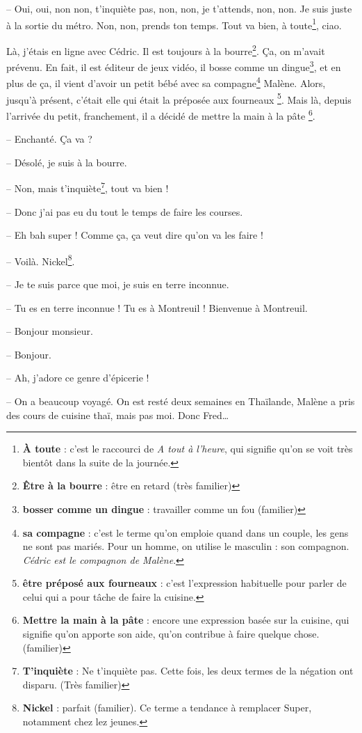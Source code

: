 \documentclass[11pt, french]{report}
\begin{document}
-- Oui, oui, non non, t’inquiète pas, non, non, je t’attends, non, non. Je suis
juste à la sortie du métro. Non, non, prends ton temps. Tout va bien,
à toute\footnote{\textbf{À toute} : c’est le raccourci de
  \textit{A tout à l’heure}, qui signifie qu’on se voit très bientôt dans la
  suite de la journée.}, ciao.

Là, j’étais en ligne avec Cédric. Il est toujours à la
bourre\footnote{\textbf{Être à la bourre} : être en retard (très familier)}.
Ça, on m’avait prévenu. En fait, il est éditeur de jeux vidéo, il bosse comme
un dingue\footnote{\textbf{bosser comme un dingue} : travailler comme un
  fou (familier)}, et en plus de ça, il vient d’avoir un petit bébé avec sa
compagne\footnote{\textbf{sa compagne} : c’est le terme qu’on emploie quand
  dans un couple, les gens ne sont pas mariés. Pour un homme, on utilise le
  masculin : son compagnon. \textit{Cédric est le compagnon de Malène}.} Malène.
Alors, jusqu’à présent, c’était elle qui était la préposée aux fourneaux
\footnote{\textbf{être préposé aux fourneaux} : c’est l’expression habituelle
  pour parler de celui qui a pour tâche de faire la cuisine.}. Mais là, depuis
l’arrivée du petit, franchement, il a décidé de mettre la main à la pâte
\footnote{\textbf{Mettre la main à la pâte} : encore une expression basée sur
  la cuisine, qui signifie qu’on apporte son aide, qu’on contribue à faire
  quelque chose. (familier)}.

-- Enchanté. Ça va ?

-- Désolé, je suis à la bourre.

-- Non, mais t’inquiète\footnote{\textbf{T'inquiète} : Ne t’inquiète pas.
  Cette fois, les deux termes de la négation ont disparu. (Très familier)},
tout va bien !

-- Donc j’ai pas eu du tout le temps de faire les courses.

-- Eh bah super ! Comme ça, ça veut dire qu’on va les faire !

-- Voilà. Nickel\footnote{\textbf{Nickel} : parfait (familier). Ce terme a
  tendance à remplacer Super, notamment chez lez jeunes.}.

-- Je te suis parce que moi, je suis en terre inconnue.

-- Tu es en terre inconnue ! Tu es à Montreuil ! Bienvenue à Montreuil.

-- Bonjour monsieur.

-- Bonjour.

-- Ah, j’adore ce genre d’épicerie !

-- On a beaucoup voyagé. On est resté deux semaines en Thaïlande, Malène a
pris des cours de cuisine thaï, mais pas moi. Donc Fred…
\end{document}
